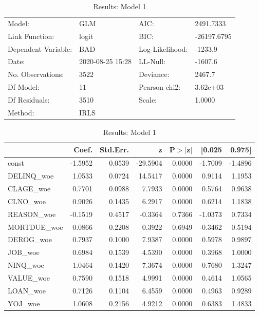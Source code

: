 \begin{appendices}
\begin{table}
\renewcommand{\arraystretch}{1.25}
\begin{center}
\begin{tabular}{llll}
\hline
Model:              & GLM              & AIC:            & 2491.7333    \\
Link Function:      & logit            & BIC:            & -26197.6795  \\
Dependent Variable: & BAD              & Log-Likelihood: & -1233.9      \\
Date:               & 2020-08-25 15:28 & LL-Null:        & -1607.6      \\
No. Observations:   & 3522             & Deviance:       & 2467.7       \\
Df Model:           & 11               & Pearson chi2:   & 3.62e+03     \\
Df Residuals:       & 3510             & Scale:          & 1.0000       \\
Method:             & IRLS             &                 &              \\
\hline
\end{tabular}
\end{center}
\begin{center}
\begin{tabular}{lrrrrrr}
\hline
             &  Coef.  & Std.Err. &    z     & P$> |$z$|$ &  [0.025 &  0.975]  \\
\hline
\hline
const        & -1.5952 &   0.0539 & -29.5904 &      0.0000 & -1.7009 & -1.4896  \\
DELINQ\_woe  &  1.0533 &   0.0724 &  14.5417 &      0.0000 &  0.9114 &  1.1953  \\
CLAGE\_woe   &  0.7701 &   0.0988 &   7.7933 &      0.0000 &  0.5764 &  0.9638  \\
CLNO\_woe    &  0.9026 &   0.1435 &   6.2917 &      0.0000 &  0.6214 &  1.1838  \\
REASON\_woe  & -0.1519 &   0.4517 &  -0.3364 &      0.7366 & -1.0373 &  0.7334  \\
MORTDUE\_woe &  0.0866 &   0.2208 &   0.3922 &      0.6949 & -0.3462 &  0.5194  \\
DEROG\_woe   &  0.7937 &   0.1000 &   7.9387 &      0.0000 &  0.5978 &  0.9897  \\
JOB\_woe     &  0.6984 &   0.1539 &   4.5390 &      0.0000 &  0.3968 &  1.0000  \\
NINQ\_woe    &  1.0464 &   0.1420 &   7.3674 &      0.0000 &  0.7680 &  1.3247  \\
VALUE\_woe   &  0.7590 &   0.1518 &   4.9991 &      0.0000 &  0.4614 &  1.0565  \\
LOAN\_woe    &  0.7126 &   0.1104 &   6.4559 &      0.0000 &  0.4963 &  0.9289  \\
YOJ\_woe     &  1.0608 &   0.2156 &   4.9212 &      0.0000 &  0.6383 &  1.4833  \\
\hline
\end{tabular}
\end{center}
\caption{Results: Model 1}
\end{table}


\end{appendices}
